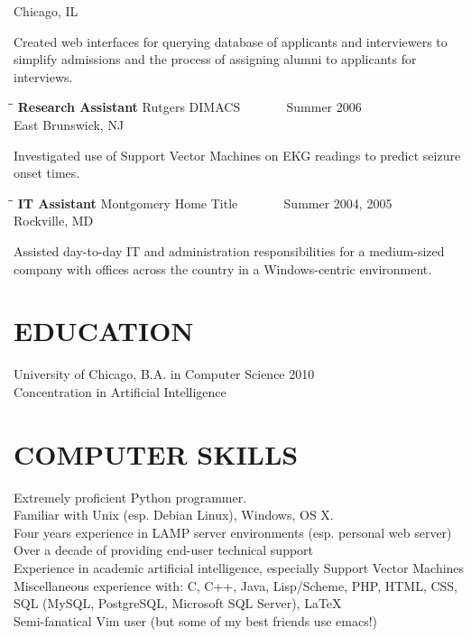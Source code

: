\documentclass{res}
\begin{document}
\begin{resume}
\begin{tabbing}
                             \>Chicago, IL
   \end{tabbing}\vspace{-20pt}      %
   Created web interfaces for querying database of applicants and interviewers to simplify admissions and the process of assigning alumni to applicants for interviews.
   \begin{tabbing}%
   \hspace{2.3in}\= \hspace{2.6in}\= \kill %
   {\bf Research Assistant}  \>Rutgers DIMACS \> ~~~~~~ Summer 2006\\
                          \>East Brunswick, NJ
   \end{tabbing}\vspace{-20pt}
   Investigated use of Support Vector Machines on EKG readings to predict seizure onset times.
   \begin{tabbing}
   \hspace{2.3in}\= \hspace{2.6in}\= \kill %
    {\bf IT Assistant} \>Montgomery Home Title \> ~~~~~~ Summer 2004, 2005\\
                             \>Rockville, MD
   \end{tabbing}\vspace{-20pt}      %
   Assisted day-to-day IT and administration responsibilities for a medium-sized company with offices across the country in a Windows-centric environment. 



\section{EDUCATION}          
    University of Chicago, B.A. in Computer Science 2010  \\   
    Concentration in Artificial Intelligence      
 
\section{COMPUTER SKILLS}          
    Extremely proficient Python programmer. \\
    Familiar with Unix (esp. Debian Linux), Windows, OS X.\\
    Four years experience in LAMP server environments (esp. personal web server)\\
    Over a decade of providing end-user technical support \\
    Experience in academic artificial intelligence, especially Support Vector Machines \\
    Miscellaneous experience with: C, C++, Java, Lisp/Scheme, PHP, HTML, CSS, SQL (MySQL, PostgreSQL, Microsoft SQL Server), \LaTeX \\
    Semi-fanatical Vim user (but some of my best friends use emacs!)


\end{resume}
\end{document}
